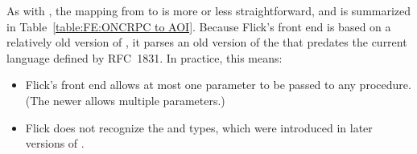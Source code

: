 As with \CORBA{} \IDL{}, the mapping from \ONCRPC{} \IDL{} to \AOI{} is more or
less straightforward, and is summarized in Table~\ref{table:FE:ONCRPC to AOI}.
Because Flick's \ONCRPC{} front end is based on a relatively old version of
\rpcgen{}, it parses an old version of the \IDL{} that predates the current
language defined by RFC~1831.  In practice, this means:

\begin{itemize}
  \item Flick's \ONCRPC{} front end allows at most one parameter to be passed
  to any procedure.  (The newer \IDL{} allows multiple parameters.)

  \item Flick does not recognize the  and  types,
  which were introduced in later versions of \rpcgen{}.
\end{itemize}

